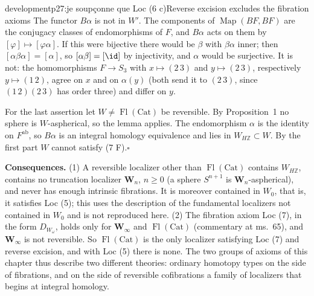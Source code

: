 \begin{dcomment}{development}{p27:je soupçonne que Loc (6 c)}{Reverse excision excludes the fibration axioms}
The functor $B\alpha$ is not in $W'$. The components of $\operatorname{Map}(BF,BF)$ are the conjugacy classes of endomorphisms of $F$, and $B\alpha$ acts on them by $[\varphi]\mapsto[\varphi\alpha]$. If this were bijective there would be $\beta$ with $\beta\alpha$ inner; then $[\alpha\beta\alpha]=[\alpha]$, so $[\alpha\beta]=[\id]$ by injectivity, and $\alpha$ would be surjective. It is not: the homomorphisms $F\to S_3$ with $x\mapsto(2\,3)$ and $y\mapsto(2\,3)$, respectively $y\mapsto(1\,2)$, agree on $x$ and on $\alpha(y)$ (both send it to $(2\,3)$, since $(1\,2)(2\,3)$ has order three) and differ on $y$.

For the last assertion let $W\ne\operatorname{Fl}(\mathrm{Cat})$ be reversible. By Proposition~1 no sphere is $W$-aspherical, so the lemma applies. The endomorphism $\alpha$ is the identity on $F^{\mathrm{ab}}$, so $B\alpha$ is an integral homology equivalence and lies in $W_{H\mathbb Z}\subset W$. By the first part $W$ cannot satisfy (7 F).\hfill$\square$

\textbf{Consequences.}
(1) A reversible localizer other than $\operatorname{Fl}(\mathrm{Cat})$ contains $W_{H\mathbb Z}$, contains no truncation localizer $\mathbf W_n$, $n\geq0$ (a sphere $S^{n+1}$ is $\mathbf W_n$-aspherical), and never has enough intrinsic fibrations. It is moreover contained in $W_0$, that is, it satisfies Loc (5); this uses the description of the fundamental localizers not contained in $W_0$ and is not reproduced here.
(2) The fibration axiom Loc (7), in the form $D_{W_\omega}$, holds only for $\mathbf W_\infty$ and $\operatorname{Fl}(\mathrm{Cat})$ (commentary at ms.~65), and $\mathbf W_\infty$ is not reversible. So $\operatorname{Fl}(\mathrm{Cat})$ is the only localizer satisfying Loc (7) and reverse excision, and with Loc (5) there is none. The two groups of axioms of this chapter thus describe two different theories: ordinary homotopy types on the side of fibrations, and on the side of reversible cofibrations a family of localizers that begins at integral homology.
\end{dcomment}


